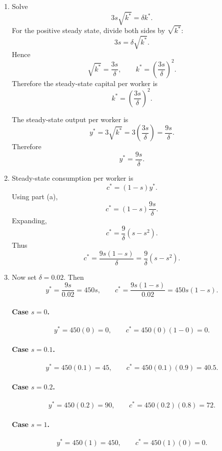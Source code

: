 \documentclass[12pt]{article}
\begin{document}
\begin{enumerate}[label=(\alph*)]
    \item
    Solve
    \[
    3s\sqrt{k^*}=\delta k^*.
    \]
    For the positive steady state, divide both sides by \(\sqrt{k^*}\):
    \[
    3s=\delta \sqrt{k^*}.
    \]
    Hence
    \[
    \sqrt{k^*}=\frac{3s}{\delta},
    \qquad
    k^*=\left(\frac{3s}{\delta}\right)^2.
    \]
    Therefore the steady-state capital per worker is
    \[
    \boxed{k^*=\left(\frac{3s}{\delta}\right)^2.}
    \]

    The steady-state output per worker is
    \[
    y^*=3\sqrt{k^*}
    =3\left(\frac{3s}{\delta}\right)
    =\frac{9s}{\delta}.
    \]
    Therefore
    \[
    \boxed{y^*=\frac{9s}{\delta}.}
    \]

    \item
    Steady-state consumption per worker is
    \[
    c^*=(1-s)y^*.
    \]
    Using part (a),
    \[
    c^*=(1-s)\frac{9s}{\delta}.
    \]
    Expanding,
    \[
    c^*=\frac{9}{\delta}(s-s^2).
    \]
    Thus
    \[
    \boxed{c^*=\frac{9s(1-s)}{\delta}=\frac{9}{\delta}(s-s^2).}
    \]

    \item
    Now set \(\delta=0.02\). Then
    \[
    y^*=\frac{9s}{0.02}=450s,
    \qquad
    c^*=\frac{9s(1-s)}{0.02}=450s(1-s).
    \]

    \paragraph{Case \(s=0\).}
    \[
    y^*=450(0)=0,
    \qquad
    c^*=450(0)(1-0)=0.
    \]

    \paragraph{Case \(s=0.1\).}
    \[
    y^*=450(0.1)=45,
    \qquad
    c^*=450(0.1)(0.9)=40.5.
    \]

    \paragraph{Case \(s=0.2\).}
    \[
    y^*=450(0.2)=90,
    \qquad
    c^*=450(0.2)(0.8)=72.
    \]

    \paragraph{Case \(s=1\).}
    \[
    y^*=450(1)=450,
    \qquad
    c^*=450(1)(0)=0.
    \]


\end{enumerate}
\end{document}
